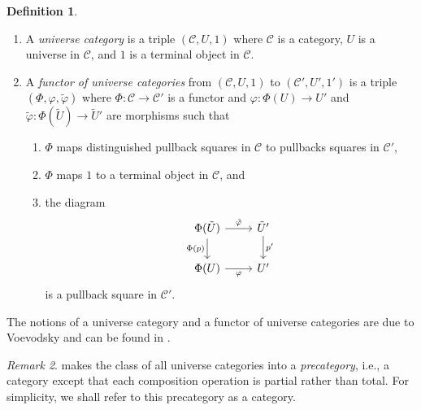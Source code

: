 \documentclass[10pt,letterpaper,cm]{nupset}
\theoremstyle{definition}
\newtheorem{definition}{Definition}[subsection]
\theoremstyle{theorem}
\theoremstyle{remark}
\newtheorem{remark}[definition]{Remark}
\newcommand{\0}{\mathbf{0}}
\newcommand{\1}{\mathbf{1}}
\newcommand{\2}{\mathbf{2}}
\renewcommand{\c}{\mathscr{C}}
\newcommand{\be}{\begin{enumerate}}
\newcommand{\ee}{\end{enumerate}}
\begin{document}
\begin{definition}\label{ucat} $  $
\be
\item A \textit{universe category} is a triple $\left(\c, U, 1\right)$ where $\c$ is a category, $U$ is a universe in $\c$, and $1$ is a terminal object in $\c$. 
\item A \textit{functor of universe categories} from $\left(\c, U, 1\right)$ to $\left(\c', U', 1'\right)$ is a triple $\left(\Phi, \varphi, \tilde{\varphi}\right)$ where $\Phi : \c \to \c'$ is a functor and $\varphi: \Phi(U) \to U'$ and $ \tilde{\varphi}: \Phi(\tilde{U}) \to \tilde{U}'$ are morphisms such that
\be
\item $\Phi$ maps distinguished pullback squares in $\c$ to pullbacks squares in $\c'$,
\item $\Phi$ maps $1$ to a terminal object in $\c$, and
\item the diagram
\[
\begin{tikzcd}
\Phi(\tilde{U}) \arrow[d, "\Phi(p)"'] \arrow[r, "\tilde{\varphi}"] & \tilde{U}' \arrow[d, "p'"] \\
\Phi(U) \arrow[r, "\varphi"']                                      & U'                        
\end{tikzcd}
\]
is a pullback square in $\c'$.
\ee
\ee
\end{definition}

The notions of a universe category and a functor of universe categories are due to Voevodsky and can be found in \cite{voev}.

\begin{remark}
 makes the class of all universe categories into a \textit{precategory}, i.e., a category except that each composition operation is partial rather than total. For simplicity, we shall refer to this precategory as a category.
\end{remark}

\pagebreak
\end{document}
